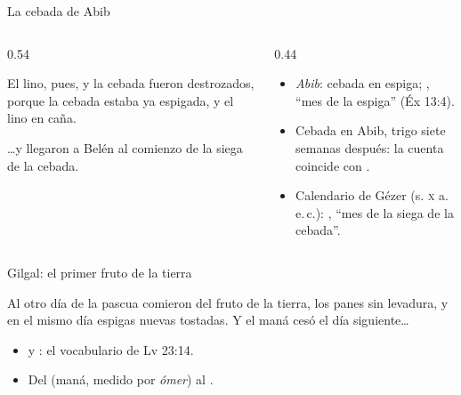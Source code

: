 \begin{frame}{La cebada de Abib}
\begin{columns}[t,onlytextwidth]
\begin{column}{0.54\textwidth}
\centering{}
\begin{cita}El lino, pues, y la cebada fueron destrozados, porque la cebada estaba ya espigada, y el lino en caña.\end{cita}
\begin{cita}\ldots{}y llegaron a Belén al comienzo de la siega de la cebada.\end{cita}
\end{column}
\begin{column}{0.44\textwidth}\small\RaggedRight
\begin{itemize}
\item \emph{Abib}: cebada en espiga; , ``mes de la espiga'' (Éx 13:4).
\item Cebada en Abib, trigo siete semanas después: la cuenta coincide con .
\item Calendario de Gézer (s. \textsc{x} a.\,e.\,c.): , ``mes de la siega de la cebada''.
\end{itemize}
\end{column}
\end{columns}
\end{frame}

\begin{frame}{Gilgal: el primer fruto de la tierra}
\centering{}
\begin{cita}Al otro día de la pascua comieron del fruto de la tierra, los panes sin levadura, y en el mismo día espigas nuevas tostadas. Y el maná cesó el día siguiente\ldots{}\end{cita}
\small\RaggedRight
\begin{itemize}
\item {} y : el vocabulario de Lv 23:14.
\item Del  (maná, medido por \emph{ómer}) al .
\end{itemize}
\end{frame}

